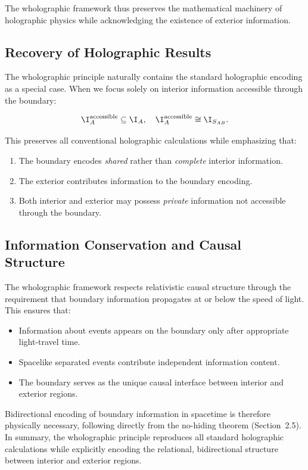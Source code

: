 ﻿\documentclass[12pt]{article}
\begin{document}
The wholographic framework thus preserves the mathematical machinery of holographic physics while acknowledging the existence of exterior information.


\subsection{Recovery of Holographic Results}


The wholographic principle naturally contains the standard holographic encoding as a special case. When we focus solely on interior information accessible through the boundary:


\begin{equation}
    \I_{A}^{\mathrm{accessible}} \subseteq \I_{A}, \quad \I_{A}^{\mathrm{accessible}} \cong \I_{S_{AB}}.
\end{equation}


This preserves all conventional holographic calculations while emphasizing that:
\begin{enumerate}
    \item The boundary encodes \emph{shared} rather than \emph{complete} interior information.
    \item The exterior contributes information to the boundary encoding.
    \item Both interior and exterior may possess \emph{private} information not accessible through the boundary.
\end{enumerate}


\subsection{Information Conservation and Causal Structure}


The wholographic framework respects relativistic causal structure through the requirement that boundary information propagates at or below the speed of light. This ensures that:
\begin{itemize}
    \item Information about events appears on the boundary only after appropriate light-travel time.
    \item Spacelike separated events contribute independent information content.
    \item The boundary serves as the unique causal interface between interior and exterior regions.
\end{itemize}


Bidirectional encoding of boundary information in spacetime is therefore physically necessary, following directly from the no-hiding theorem (Section~2.5). In summary, the wholographic principle reproduces all standard holographic calculations while explicitly encoding the relational, bidirectional structure between interior and exterior regions.
\end{document}
